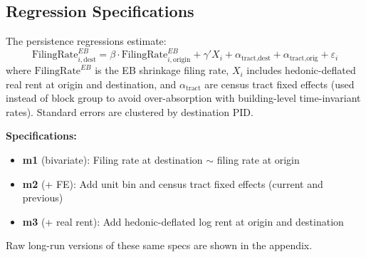 \documentclass[
  11pt,
]{article}
\providecommand{\tightlist}{%
  \setlength{\itemsep}{0pt}\setlength{\parskip}{0pt}}
\begin{document}
\subsection{Regression Specifications}\label{regression-specifications}

The persistence regressions estimate: \[
\text{FilingRate}^{EB}_{i,\text{dest}} = \beta \cdot \text{FilingRate}^{EB}_{i,\text{origin}} + \gamma' X_i + \alpha_{\text{tract,dest}} + \alpha_{\text{tract,orig}} + \varepsilon_i
\] where \(\text{FilingRate}^{EB}\) is the EB shrinkage filing rate,
\(X_i\) includes hedonic-deflated real rent at origin and destination,
and \(\alpha_{\text{tract}}\) are census tract fixed effects (used
instead of block group to avoid over-absorption with building-level
time-invariant rates). Standard errors are clustered by destination PID.

\textbf{Specifications:}

\begin{itemize}
\tightlist
\item
  \textbf{m1} (bivariate): Filing rate at destination \(\sim\) filing
  rate at origin
\item
  \textbf{m2} (+ FE): Add unit bin and census tract fixed effects
  (current and previous)
\item
  \textbf{m3} (+ real rent): Add hedonic-deflated log rent at origin and
  destination
\end{itemize}

Raw long-run versions of these same specs are shown in the appendix.
\end{document}
